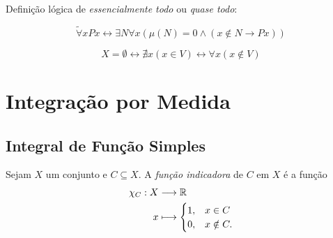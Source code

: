 Definição lógica de \emph{essencialmente todo} ou  \emph{quase todo}:

\begin{equation*}
\tilde\forall x Px \leftrightarrow \exists N\forall x (\mu(N)=0 \wedge (x\notin N \rightarrow Px))
\end{equation*}

\begin{equation*}
X=\emptyset \leftrightarrow \nexists x (x \in V) \leftrightarrow \forall x(x \notin V)
\end{equation*}






\chapter{Integração por Medida}

\section{Integral de Função Simples}

\begin{defi}
Sejam $X$ um conjunto e $C \subseteq X$. A \emph{função indicadora} de $C$ em $X$ é a função
	\begin{align*}
	{\chi_C}: {X} &\longrightarrow {\mathbb{R}} \\{x} &\longmapsto {
	\begin{cases}
		1,& x \in C \\
		0,& x \notin C.
	\end{cases}
	}
	\end{align*}
\end{defi}

